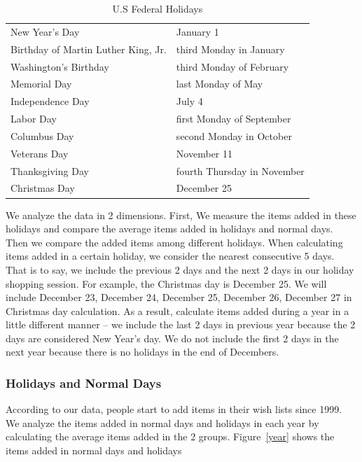 \begin{table}[!ht]
\centering
\caption{U.S Federal Holidays}
\label{tb:holiday}
\begin{adjustbox}{max width=.45\textwidth}
\begin{tabular}{ll}
New Year's Day & January 1  \\
Birthday of Martin Luther King, Jr. & third Monday in January  \\
Washington's Birthday & third Monday of February  \\
Memorial Day & last Monday of May \\
Independence Day & July 4  \\
Labor Day & first Monday of September  \\
Columbus Day & second Monday in October  \\
Veterans Day & November 11  \\
Thanksgiving Day & fourth Thursday in November  \\
Christmas Day & December 25  \\
\end{tabular}
\end{adjustbox}
\end{table}

We analyze the data in 2 dimensions. First, We measure the items added in these holidays and compare the average items added in holidays and normal days. Then we compare the added items among different holidays. When calculating items added in a certain holiday, we consider the nearest consecutive 5 days. That is to say, we include the previous 2 days and the next 2 days in our holiday shopping session. For example, the Christmas day is December 25. We will include December 23, December 24, December 25, December 26, December 27 in Christmas day calculation. As a result, calculate items added during a year in a little different manner -- we include the last 2 days in previous year because the 2 days are considered New Year's day. We do not include the first 2 days in the next year because there is no holidays in the end of Decembers.


\subsubsection{Holidays and Normal Days}
According to our data, people start to add items in their wish lists since 1999. We analyze the items added in normal days and holidays in each year by calculating the average items added in the 2 groups. Figure~\ref{year} shows the items added in normal days and holidays 


